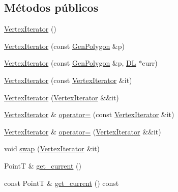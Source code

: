 \subsection*{Métodos públicos}
\begin{DoxyCompactItemize}
\item 
\hyperlink{class_designar_1_1_gen_polygon_1_1_vertex_iterator_af12ab8f901a5d0fe153a8a5ce8fd9639}{Vertex\+Iterator} ()
\item 
\hyperlink{class_designar_1_1_gen_polygon_1_1_vertex_iterator_a5fd0787c03b2663aa377fc7dc6b1b782}{Vertex\+Iterator} (const \hyperlink{class_designar_1_1_gen_polygon}{Gen\+Polygon} \&p)
\item 
\hyperlink{class_designar_1_1_gen_polygon_1_1_vertex_iterator_a3d95cc56c6e46ea79c388e0e024b2be7}{Vertex\+Iterator} (const \hyperlink{class_designar_1_1_gen_polygon}{Gen\+Polygon} \&p, \hyperlink{class_designar_1_1_d_l}{DL} $\ast$curr)
\item 
\hyperlink{class_designar_1_1_gen_polygon_1_1_vertex_iterator_a21157bfe51250c44cc0c7a85424a9a97}{Vertex\+Iterator} (const \hyperlink{class_designar_1_1_gen_polygon_1_1_vertex_iterator}{Vertex\+Iterator} \&it)
\item 
\hyperlink{class_designar_1_1_gen_polygon_1_1_vertex_iterator_a1686e78e3ea5c376e24ff12a16e57682}{Vertex\+Iterator} (\hyperlink{class_designar_1_1_gen_polygon_1_1_vertex_iterator}{Vertex\+Iterator} \&\&it)
\item 
\hyperlink{class_designar_1_1_gen_polygon_1_1_vertex_iterator}{Vertex\+Iterator} \& \hyperlink{class_designar_1_1_gen_polygon_1_1_vertex_iterator_a7ca1c2552ea82acbf3e893b6cb554728}{operator=} (const \hyperlink{class_designar_1_1_gen_polygon_1_1_vertex_iterator}{Vertex\+Iterator} \&it)
\item 
\hyperlink{class_designar_1_1_gen_polygon_1_1_vertex_iterator}{Vertex\+Iterator} \& \hyperlink{class_designar_1_1_gen_polygon_1_1_vertex_iterator_a4781c8fdb3a9d942714f395136fe85a8}{operator=} (\hyperlink{class_designar_1_1_gen_polygon_1_1_vertex_iterator}{Vertex\+Iterator} \&\&it)
\item 
void \hyperlink{class_designar_1_1_gen_polygon_1_1_vertex_iterator_a7bf89e1ca4095b74949f06937d03bb20}{swap} (\hyperlink{class_designar_1_1_gen_polygon_1_1_vertex_iterator}{Vertex\+Iterator} \&it)
\item 
PointT \& \hyperlink{class_designar_1_1_gen_polygon_1_1_vertex_iterator_acf3d94036e4b8cc224f5975625865263}{get\+\_\+current} ()
\item 
const PointT \& \hyperlink{class_designar_1_1_gen_polygon_1_1_vertex_iterator_a2a36a8eb3d301865dd014e9036c20186}{get\+\_\+current} () const

\end{DoxyCompactItemize}
